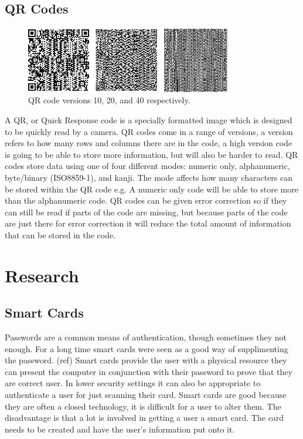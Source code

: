 \documentclass[]{report}   %
\begin{document}
\subsection{QR Codes}
\begin{figure}[H]
\centering
\includegraphics[width=9cm]{QRCodes.png}
\caption{QR code versions 10, 20, and 40 respectively.}
\end{figure}

A QR, or Quick Response code \cite{QR} is a specially formatted image which is designed to be quickly read by a camera. QR codes come in a range of versions, a version refers to how many rows and columns there are in the code, a high version code is going to be able to store more information, but will also be harder to read. QR codes store data using one of four different modes: numeric only, alphanumeric, byte/binary (ISO8859-1), and kanji. The mode affects how many characters can be stored within the QR code e.g. A numeric only code will be able to store more than the alphanumeric code. QR codes can be given error correction so if they can still be read if parts of the code are missing, but because parts of the code are just there for error correction it will reduce the total amount of information that can be stored in the code.

\section{Research}
\subsection{Smart Cards}
Passwords are a common means of authentication, though sometimes they not enough. For a long time smart cards were seen as a good way of supplimenting the password. (ref)  Smart cards provide the user with a physical resource they can present the computer in conjunction with their password to prove that they are correct user. In lower security settings it can also be appropriate to authenticate a user for just scanning their card. Smart cards are good because they are often a closed technology, it is difficult for a user to alter them. The disadvantage is that a lot is involved in getting a user a smart card. The card needs to be created and have the user's information put onto it.
\end{document}
